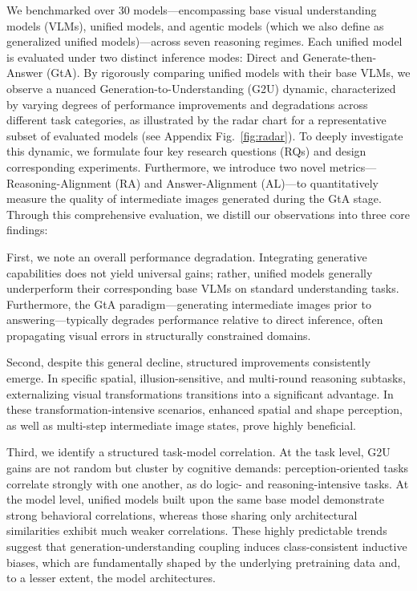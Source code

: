 \documentclass{article}
\theoremstyle{plain}
\theoremstyle{definition}
\theoremstyle{remark}
\begin{document}
We benchmarked over 30 models—encompassing base visual understanding models (VLMs), unified models, and agentic models (which we also define as generalized unified models)—across seven reasoning regimes. Each unified model is evaluated under two distinct inference modes: Direct and Generate-then-Answer (GtA). By rigorously comparing unified models with their base VLMs, we observe a nuanced Generation-to-Understanding (G2U) dynamic, characterized by varying degrees of performance improvements and degradations across different task categories, as illustrated by the radar chart for a representative subset of evaluated models (see Appendix Fig.~\ref{fig:radar}). To deeply investigate this dynamic, we formulate four key research questions (RQs) and design corresponding experiments. Furthermore, we introduce two novel metrics—Reasoning-Alignment (RA) and Answer-Alignment (AL)—to quantitatively measure the quality of intermediate images generated during the GtA stage. Through this comprehensive evaluation, we distill our observations into three core findings:

First, we note an overall performance degradation. Integrating generative capabilities does not yield universal gains; rather, unified models generally underperform their corresponding base VLMs on standard understanding tasks. Furthermore, the GtA paradigm—generating intermediate images prior to answering—typically degrades performance relative to direct inference, often propagating visual errors in structurally constrained domains.

Second, despite this general decline, structured improvements consistently emerge. In specific spatial, illusion-sensitive, and multi-round reasoning subtasks, externalizing visual transformations transitions into a significant advantage. In these transformation-intensive scenarios, enhanced spatial and shape perception, as well as multi-step intermediate image states, prove highly beneficial.

Third, we identify a structured task-model correlation. At the task level, G2U gains are not random but cluster by cognitive demands: perception-oriented tasks correlate strongly with one another, as do logic- and reasoning-intensive tasks. At the model level, unified models built upon the same base model demonstrate strong behavioral correlations, whereas those sharing only architectural similarities exhibit much weaker correlations. These highly predictable trends suggest that generation-understanding coupling induces class-consistent inductive biases, which are fundamentally shaped by the underlying pretraining data and, to a lesser extent, the model architectures.
\end{document}
